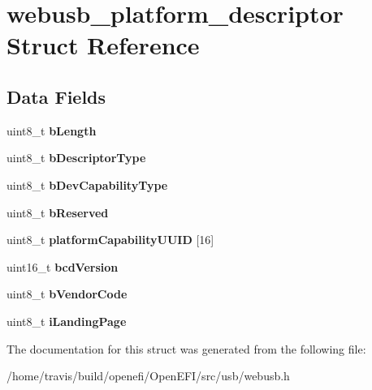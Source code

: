 \hypertarget{structwebusb__platform__descriptor}{}\section{webusb\+\_\+platform\+\_\+descriptor Struct Reference}
\label{structwebusb__platform__descriptor}
\subsection*{Data Fields}
\begin{DoxyCompactItemize}
\item 
uint8\+\_\+t {\bfseries b\+Length}\hypertarget{structwebusb__platform__descriptor_affdc82ed98f91df1f86ff5b31daba385}{}\label{structwebusb__platform__descriptor_affdc82ed98f91df1f86ff5b31daba385}

\item 
uint8\+\_\+t {\bfseries b\+Descriptor\+Type}\hypertarget{structwebusb__platform__descriptor_ad096201d7369d85b61e5ef41f81004b0}{}\label{structwebusb__platform__descriptor_ad096201d7369d85b61e5ef41f81004b0}

\item 
uint8\+\_\+t {\bfseries b\+Dev\+Capability\+Type}\hypertarget{structwebusb__platform__descriptor_ad41c111aafa4eca6b5da3f7ca165faf9}{}\label{structwebusb__platform__descriptor_ad41c111aafa4eca6b5da3f7ca165faf9}

\item 
uint8\+\_\+t {\bfseries b\+Reserved}\hypertarget{structwebusb__platform__descriptor_a5ba769fdb24b6ae8835f22c18e9f0f39}{}\label{structwebusb__platform__descriptor_a5ba769fdb24b6ae8835f22c18e9f0f39}

\item 
uint8\+\_\+t {\bfseries platform\+Capability\+U\+U\+ID} \mbox{[}16\mbox{]}\hypertarget{structwebusb__platform__descriptor_a5051b237a5f4ae27e339477cf938763d}{}\label{structwebusb__platform__descriptor_a5051b237a5f4ae27e339477cf938763d}

\item 
uint16\+\_\+t {\bfseries bcd\+Version}\hypertarget{structwebusb__platform__descriptor_a4e7761e12b7502d5281b61d23ac5f69c}{}\label{structwebusb__platform__descriptor_a4e7761e12b7502d5281b61d23ac5f69c}

\item 
uint8\+\_\+t {\bfseries b\+Vendor\+Code}\hypertarget{structwebusb__platform__descriptor_ad16fde219153472eb8508a081bc132c8}{}\label{structwebusb__platform__descriptor_ad16fde219153472eb8508a081bc132c8}

\item 
uint8\+\_\+t {\bfseries i\+Landing\+Page}\hypertarget{structwebusb__platform__descriptor_a2139665bb12a11386286837347d3777e}{}\label{structwebusb__platform__descriptor_a2139665bb12a11386286837347d3777e}

\end{DoxyCompactItemize}


The documentation for this struct was generated from the following file\+:\begin{DoxyCompactItemize}
\item 
/home/travis/build/openefi/\+Open\+E\+F\+I/src/usb/webusb.\+h\end{DoxyCompactItemize}
